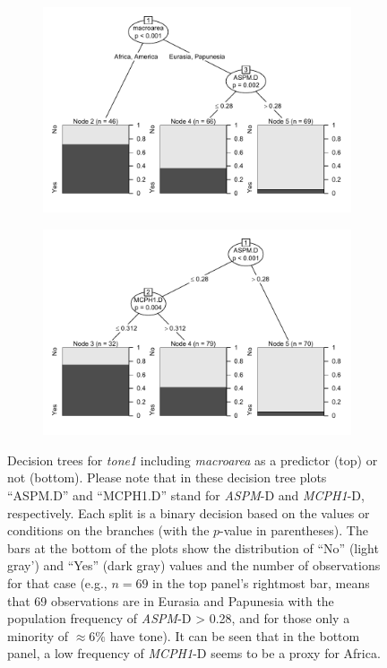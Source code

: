 \documentclass[twoside,onecolumn]{article}
\begin{document}
\begin{figure}[h]
  \centering
  \begin{subfigure}{0.75\linewidth}
    \includegraphics[width=\textwidth]{../../code/figures/tone1_decision_trees_macroarea}
  \end{subfigure}
  \begin{subfigure}{0.75\linewidth}
    \includegraphics[width=\textwidth]{../../code/figures/tone1_decision_trees_nomacroarea}
  \end{subfigure}
  \caption{Decision trees for \textit{tone1} including \textit{macroarea} as a predictor (top) or not (bottom). Please note that in these decision tree plots ``ASPM.D'' and ``MCPH1.D'' stand for \textit{ASPM}-D and \textit{MCPH1}-D, respectively. Each split is a binary decision based on the values or conditions on the branches (with the $p$-value in parentheses). The bars at the bottom of the plots show the distribution of ``No'' (light gray') and ``Yes'' (dark gray) values and the number of observations for that case (e.g., $n = 69$ in the top panel's rightmost bar, means that 69 observations are in Eurasia and Papunesia with the population frequency of \textit{ASPM}-D > 0.28, and for those only a minority of $\approx 6\%$ have tone). It can be seen that in the bottom panel, a low frequency of \textit{MCPH1}-D seems to be a proxy for Africa.}
  \label{Fig:tone1_decision_trees}
\end{figure}
\end{document}
